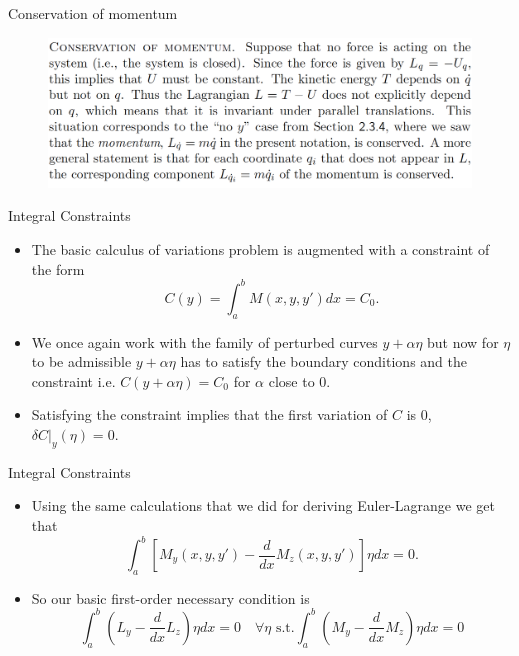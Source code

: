 \documentclass{beamer}
\begin{document}
\begin{frame}{Conservation of momentum}
    \begin{figure}
        \centering
        \includegraphics[width=\linewidth]{ch2/fig25.png}
    \end{figure}
\end{frame}

\begin{frame}{Integral Constraints}
    \begin{itemize}
        \item The basic calculus of variations problem is augmented with a constraint of the form
        \begin{equation}
            C(y) = \int_a^b M(x, y, y')dx = C_0.
        \end{equation}
        \item We once again work with the family of perturbed curves $y + \alpha \eta$ but now for $\eta$ to be admissible $y+\alpha \eta$ has to satisfy the boundary conditions and the constraint i.e. $C(y + \alpha \eta) = C_0$ for $\alpha$ close to 0.
        \item Satisfying the constraint implies that the first variation of $C$ is 0, $\delta C\vert_y(\eta) = 0.$
    \end{itemize}
\end{frame}

\begin{frame}{Integral Constraints}
    \begin{itemize}
        \item Using the same calculations that we did for deriving Euler-Lagrange we get that
        \begin{equation}
            \int_a^b[M_y(x, y, y') - \frac{d}{dx}M_z(x, y, y')]\eta dx = 0.
        \end{equation}
        \item So our basic first-order necessary condition is
        \begin{equation}
            \int_a^b(L_y - \frac{d}{dx}L_z)\eta dx = 0 \quad \forall \eta \,\, \textrm{s.t.} \int_a^b(M_y - \frac{d}{dx}M_z)\eta dx = 0
        \end{equation}
    \end{itemize}
\end{frame}
\end{document}
